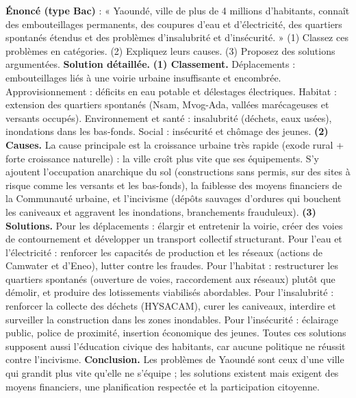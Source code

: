 \documentclass[11pt]{article}
\begin{document}
\begin{exoresolu}
\textbf{Énoncé (type Bac)} : « Yaoundé, ville de plus de 4 millions d'habitants, connaît des embouteillages permanents, des coupures d'eau et d'électricité, des quartiers spontanés étendus et des problèmes d'insalubrité et d'insécurité. » (1) Classez ces problèmes en catégories. (2) Expliquez leurs causes. (3) Proposez des solutions argumentées.
\tcblower
\textbf{Solution détaillée.}
\textbf{(1) Classement.} Déplacements : embouteillages liés à une voirie urbaine insuffisante et encombrée. Approvisionnement : déficits en eau potable et délestages électriques. Habitat : extension des quartiers spontanés (Nsam, Mvog-Ada, vallées marécageuses et versants occupés). Environnement et santé : insalubrité (déchets, eaux usées), inondations dans les bas-fonds. Social : insécurité et chômage des jeunes.
\textbf{(2) Causes.} La cause principale est la croissance urbaine très rapide (exode rural + forte croissance naturelle) : la ville croît plus vite que ses équipements. S'y ajoutent l'occupation anarchique du sol (constructions sans permis, sur des sites à risque comme les versants et les bas-fonds), la faiblesse des moyens financiers de la Communauté urbaine, et l'incivisme (dépôts sauvages d'ordures qui bouchent les caniveaux et aggravent les inondations, branchements frauduleux).
\textbf{(3) Solutions.} Pour les déplacements : élargir et entretenir la voirie, créer des voies de contournement et développer un transport collectif structurant. Pour l'eau et l'électricité : renforcer les capacités de production et les réseaux (actions de Camwater et d'Eneo), lutter contre les fraudes. Pour l'habitat : restructurer les quartiers spontanés (ouverture de voies, raccordement aux réseaux) plutôt que démolir, et produire des lotissements viabilisés abordables. Pour l'insalubrité : renforcer la collecte des déchets (HYSACAM), curer les caniveaux, interdire et surveiller la construction dans les zones inondables. Pour l'insécurité : éclairage public, police de proximité, insertion économique des jeunes. Toutes ces solutions supposent aussi l'éducation civique des habitants, car aucune politique ne réussit contre l'incivisme.
\textbf{Conclusion.} Les problèmes de Yaoundé sont ceux d'une ville qui grandit plus vite qu'elle ne s'équipe ; les solutions existent mais exigent des moyens financiers, une planification respectée et la participation citoyenne.
\end{exoresolu}
\end{document}
